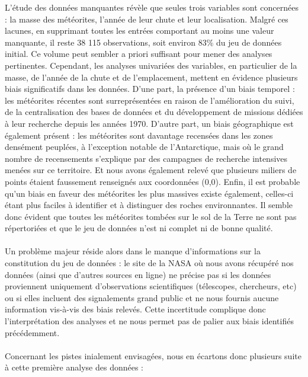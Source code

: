 \documentclass[12pt]{article}
\begin{document}
L’étude des données manquantes révèle que seules trois variables sont concernées : la masse des météorites, l’année de leur chute et leur localisation. Malgré ces lacunes, en supprimant toutes les entrées comportant au moins une valeur manquante, il reste 38 115 observations, soit environ 83\% du jeu de données initial. Ce volume peut sembler a priori suffisant pour mener des analyses pertinentes. Cependant, les analyses univariées des variables, en particulier de la masse, de l'année de la chute et de l'emplacement,  mettent en évidence plusieurs biais significatifs dans les données. D’une part, la présence d'un biais temporel : les météorites récentes sont surreprésentées en raison de l’amélioration du suivi, de la centralisation des bases de données et du développement de missions dédiées à leur recherche depuis les années 1970. D’autre part, un biais géographique est également présent : les météorites sont davantage recensées dans les zones densément peuplées, à l’exception notable de l’Antarctique, mais où  le grand nombre de recensements s'explique par des campagnes de recherche intensives menées sur ce territoire. Et nous avons également relevé que plusieurs miliers de points étaient faussement renseignés aux coordonnées (0,0). Enfin, il est probable qu’un biais en faveur des météorites les plus massives existe également, celles-ci étant plus faciles à identifier et à distinguer des roches environnantes. Il semble donc évident que toutes les météorites tombées sur le sol de la Terre ne sont pas répertoriées et que le jeu de données n'est ni complet ni de bonne qualité.\\
\\
Un problème majeur réside alors dans le manque d’informations sur la constitution du jeu de données : le site de la NASA où nous avons récupéré nos données (ainsi que d’autres sources en ligne) ne précise pas si les données proviennent uniquement d’observations scientifiques (télescopes, chercheurs, etc) ou si elles incluent des signalements grand public et ne nous fournis aucune information vis-à-vis des biais relevés. Cette incertitude complique donc l’interprétation des analyses et ne nous permet pas de palier aux biais identifiés précédemment.\\
\\
Concernant les pistes inialement envisagées, nous en écartons donc plusieurs suite à cette première analyse des données :\\
\\
\end{document}
